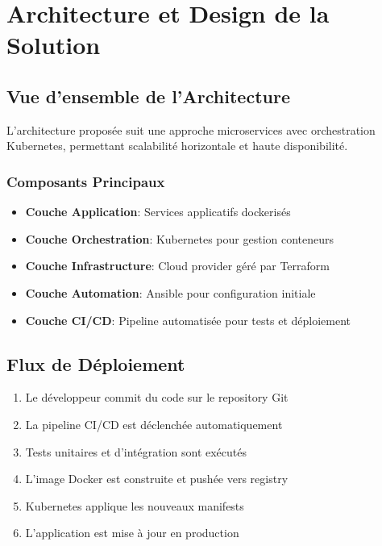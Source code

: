 \documentclass[12pt,a4paper]{report}
\begin{document}
\newpage

\chapter{Architecture et Design de la Solution}

\section{Vue d'ensemble de l'Architecture}

L'architecture proposée suit une approche microservices avec orchestration Kubernetes, permettant scalabilité horizontale et haute disponibilité.

\subsection{Composants Principaux}

\begin{itemize}
    \item \textbf{Couche Application}: Services applicatifs dockerisés
    \item \textbf{Couche Orchestration}: Kubernetes pour gestion conteneurs
    \item \textbf{Couche Infrastructure}: Cloud provider géré par Terraform
    \item \textbf{Couche Automation}: Ansible pour configuration initiale
    \item \textbf{Couche CI/CD}: Pipeline automatisée pour tests et déploiement
\end{itemize}

\section{Flux de Déploiement}

\begin{enumerate}
    \item Le développeur commit du code sur le repository Git
    \item La pipeline CI/CD est déclenchée automatiquement
    \item Tests unitaires et d'intégration sont exécutés
    \item L'image Docker est construite et pushée vers registry
    \item Kubernetes applique les nouveaux manifests
    \item L'application est mise à jour en production
\end{enumerate}
\end{document}

